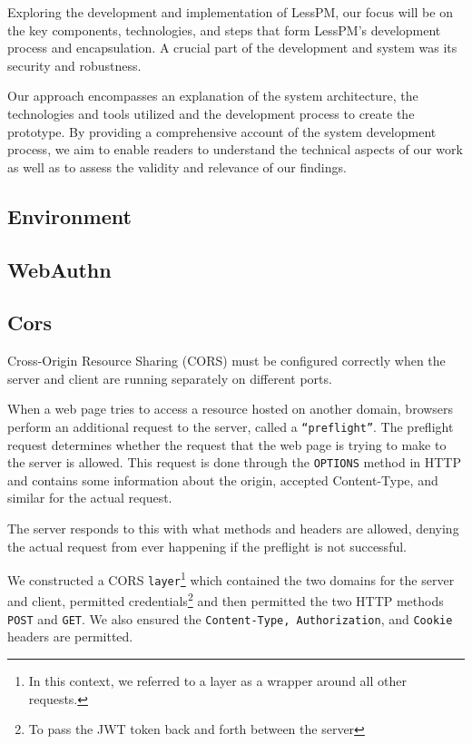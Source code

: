 
Exploring the development and implementation of LessPM, our focus will be on the
key components, technologies, and steps that form LessPM's development process
and encapsulation.
A crucial part of the development and system was its security and robustness.

Our approach encompasses an explanation of the system architecture, the
technologies and tools utilized and the development process to create the
prototype.
By providing a comprehensive account of the system development process, we aim
to enable readers to understand the technical aspects of our work as well
as to assess the validity and relevance of our findings.

\subsection{Environment}\label{subsec:environment}


\subsection{WebAuthn}\label{subsec:webauthn-methodology}


\subsection{Cors}\label{subsec:cors}
Cross-Origin Resource Sharing (CORS) must be configured correctly when the
server and client are running separately on different ports.

When a web page tries to access a resource hosted on another domain, browsers
perform an additional request to the server, called a \texttt{``preflight''}.
The preflight request determines whether the
request that the web page is trying to make to the server is allowed.
This request is done through the \texttt{OPTIONS} method in HTTP and contains
some information about the origin, accepted Content-Type, and similar for the
actual request.

The server responds to this with what methods and headers are allowed, denying
the actual request from ever happening if the preflight is not successful.

We constructed a CORS \texttt{layer}\footnote{
  In this context, we referred to a layer as a wrapper around all other
  requests.
} which contained the two domains for the server and client, permitted
credentials\footnote{
  To pass the JWT token back and forth between the server
} and then permitted the two HTTP methods \texttt{POST} and \texttt{GET}.
We also ensured the \texttt{Content-Type, Authorization}, and \texttt{Cookie}
headers are permitted.


